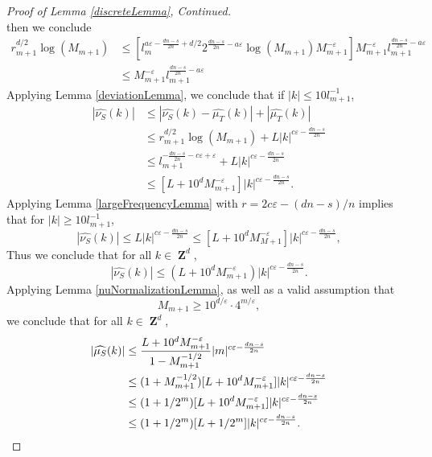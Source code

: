 \documentclass[12pt,reqno]{article}
\numberwithin{equation}{section}
\DeclareMathOperator{\ZZ}{\mathbf{Z}}
\begin{document}
\begin{proof}[Proof of Lemma \ref{discreteLemma}, Continued]
\begin{equation}
    \end{equation}
    then we conclude
    \begin{align*}
        r_{m+1}^{d/2} \log(M_{m+1}) &\leq \left[ l_m^{a\varepsilon - \frac{dn-s}{2n} + d/2} 2^{\frac{dn-s}{2n} - a \varepsilon} \log(M_{m+1}) M_{m+1}^{-\varepsilon} \right] M_{m+1}^{-\varepsilon} l_{m+1}^{\frac{dn-s}{2n} - a\varepsilon}\\
        &\leq M_{m+1}^{-\varepsilon} l_{m+1}^{\frac{dn-s}{2n} - a \varepsilon}
    \end{align*}
    Applying Lemma \ref{deviationLemma}, we conclude that if $|k| \leq 10 l_{m+1}^{-1}$,
    \begin{align*}
        |\widehat{\nu_{S}}(k)| &\leq |\widehat{\nu_{S}}(k) - \widehat{\mu_T}(k)| + |\widehat{\mu_T}(k)|\\
        &\leq r_{m+1}^{d/2} \log(M_{m+1}) + L |k|^{c\varepsilon - \frac{dn-s}{2n}}\\
        &\leq l_{m+1}^{-\frac{dn-s}{2n}-c\varepsilon + \varepsilon} + L |k|^{c\varepsilon - \frac{dn-s}{2n}}\\
        &\leq \left[ L + 10^d M_{m+1}^{-\varepsilon} \right] |k|^{c\varepsilon - \frac{dn-s}{2n}}.
    \end{align*}
    Applying Lemma \ref{largeFrequencyLemma} with $r = 2c\varepsilon - (dn - s)/n$ implies that for $|k| \geq 10l_{m+1}^{-1}$,
    \[ |\widehat{\nu_{S}}(k)| \leq L |k|^{c\varepsilon-\frac{dn-s}{2n}} \leq [L + 10^d M_{M+1}^{-\varepsilon}]|k|^{c\varepsilon - \frac{dn-s}{2n}}, \]
    Thus we conclude that for all $k \in \ZZ^d$,
    \[ |\widehat{\nu_S}(k)| \leq (L + 10^d M_{m+1}^{-\varepsilon}) |k|^{c\varepsilon - \frac{dn-s}{2n}}. \]
    Applying Lemma \ref{nuNormalizationLemma}, as well as a valid assumption that
    \begin{equation} \label{equation129301923109}
        M_{m+1} \geq 10^{d/\varepsilon} \cdot 4^{m/\varepsilon},
    \end{equation}
    we conclude that for all $k \in \ZZ^d$,
    \begin{align*}
        |\widehat{\mu_S}(k)| &\leq \frac{L + 10^d M_{m+1}^{-\varepsilon}}{1 - M_{m+1}^{-1/2}} |m|^{c\varepsilon - \frac{dn-s}{2n}}\\
        &\leq (1 + M_{m+1}^{-1/2}) [L + 10^d M_{m+1}^{-\varepsilon}] |k|^{c\varepsilon - \frac{dn-s}{2n}}\\
        &\leq (1 + 1/2^m) [L + 10^d M_{m+1}^{-\varepsilon}] |k|^{c\varepsilon - \frac{dn-s}{2n}}\\
        &\leq (1 + 1/2^m) [L + 1/2^m] |k|^{c\varepsilon - \frac{dn-s}{2n}}. \qedhere
    \end{align*}
\end{proof}
\end{document}

